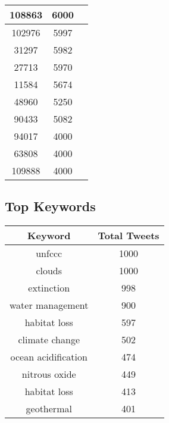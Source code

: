 \documentclass{article}\usepackage[T1]{fontenc}
\begin{document}
\begin{tabular}{|c|c|c|}
 \hline
108863 & 6000\\ 
 \hline
102976 & 5997\\ 
 \hline
31297 & 5982\\ 
 \hline
27713 & 5970\\ 
 \hline
11584 & 5674\\ 
 \hline
48960 & 5250\\ 
 \hline
90433 & 5082\\ 
 \hline
94017 & 4000\\ 
 \hline
63808 & 4000\\ 
 \hline
109888 & 4000\\ 
 \hline
\end{tabular}\subsection*{Top Keywords}\begin{tabular}{|c|c|}         \hline         Keyword & Total Tweets \\ 
 \hline
unfccc & 1000\\ 
 \hline
clouds & 1000\\ 
 \hline
extinction & 998\\ 
 \hline
water management & 900\\ 
 \hline
habitat loss & 597\\ 
 \hline
climate change & 502\\ 
 \hline
ocean acidification & 474\\ 
 \hline
nitrous oxide & 449\\ 
 \hline
habitat loss & 413\\ 
 \hline
geothermal & 401\\ 
 \hline
\end{tabular}
\end{document}
